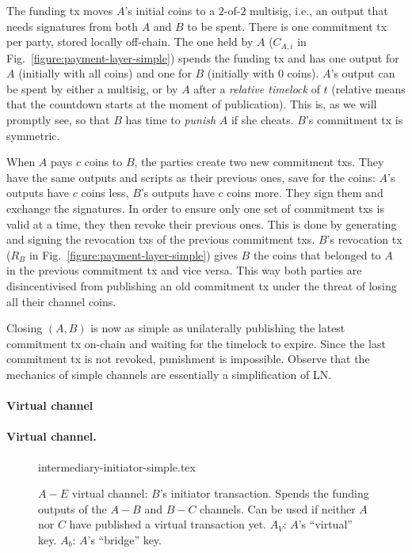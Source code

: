  The funding tx moves $A$'s initial coins to a $2$-of-$2$ multisig, i.e., an
  output that needs signatures from both $A$ and $B$ to be spent. There is one
  commitment tx per party, stored locally off-chain. The one held by $A$
  ($C_{A,i}$ in Fig.~\ref{figure:payment-layer-simple}) spends the funding tx
  and has one output for $A$ (initially with all coins) and one for $B$
  (initially with $0$ coins). $A$'s output can be spent by either a multisig, or
  by $A$ after a \emph{relative timelock} of $t$ (relative means that the countdown starts at the moment of
  publication). This is, as we will promptly see, so
  that $B$ has time to \emph{punish} $A$ if she cheats. $B$'s commitment tx
  is symmetric.

  When $A$ pays $c$ coins to $B$, the parties create two new commitment txs.
  They have the same outputs and scripts as their previous ones, save for the
  coins: $A$'s outputs have $c$ coins less, $B$'s outputs have $c$ coins more.
  They sign them and exchange the signatures. In order to ensure only one set of
  commitment txs is valid at a time, they then revoke their previous ones. This
  is done by generating and signing the revocation txs of the previous
  commitment txs. $B$'s revocation tx ($R_B$ in
  Fig.~\ref{figure:payment-layer-simple}) gives $B$ the coins that belonged
  to $A$ in the previous commitment tx and vice versa. This way both parties are
  disincentivised from publishing an old commitment tx under the threat of
  losing all their channel coins.

  Closing $(A, B)$ is now as simple as unilaterally publishing the latest
  commitment tx on-chain and waiting for the timelock to expire. Since the last
  commitment tx is not revoked, punishment is impossible. Observe that the
  mechanics of simple channels are essentially a simplification of LN.

  \makeatletter%
    {\paragraph{Virtual channel}}%
    {\paragraph{Virtual channel.}}%
  \makeatother%
  \addtolength{\intextsep}{-15pt}
  \begin{figure}[!htbp]
    {intermediary-initiator-simple.tex}
    \caption{$A-E$ virtual channel: $B$'s initiator transaction. Spends the
    funding outputs of the $A-B$ and $B-C$ channels. Can be used if neither
    $A$ nor $C$ have published a virtual transaction yet. $A_V$: $A$'s
    ``virtual'' key. $A_b$: $A$'s ``bridge'' key.}
    \label{figure:virtual-layer-initiator-simple}
  \end{figure}
  \addtolength{\intextsep}{15pt}

